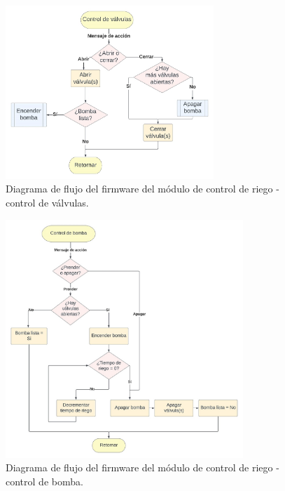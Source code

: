 \begin{figure}[!h]
	\centering
	\includegraphics[width=0.7\textwidth]{./Figures/chapter3/FirmwareValveControl.jpg}
	\caption[Diagrama de flujo del firmware del módulo de control de riego - control de válvulas]{Diagrama de flujo del firmware del módulo de control de riego - control de válvulas.}
	\label{fig:flow_valvecontrol}
\end{figure}

\begin{figure}[!h]
	\centering
	\includegraphics[width=0.8\textwidth]{./Figures/chapter3/FirmwarePumpControl.jpg}
	\caption[Diagrama de flujo del firmware del módulo de control de riego - control de bomba]{Diagrama de flujo del firmware del módulo de control de riego - control de bomba.}
	\label{fig:flow_bombacontrol}
\end{figure}







